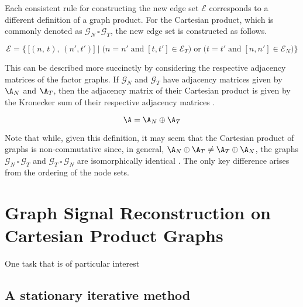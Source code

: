 Each consistent rule for constructing the new edge set $\mathcal{E}$ corresponds to a different definition of a graph product. For the Cartesian product, which is commonly denoted as $\mathcal{G}_N \, \square \, \mathcal{G}_T$, the new edge set is constructed as follows. 

\begin{equation}
    \mathcal{E} = \Big\{\, \big[(n, \, t), \, (n',  t') \big] \; \Big| \; \big(n = n' \; \text{and} \; [t, t'] \in \mathcal{E}_T \big) \; \text{or} \; \big(t = t' \; \text{and} \; [n, n'] \in \mathcal{E}_N\big)  \Big\}
\end{equation}
     

This can be described more succinctly by considering the respective adjacency matrices of the factor graphs. If $\mathcal{G}_N$ and $\mathcal{G}_T$ have adjacency matrices given by $\A_N$ and $\A_T$, then the adjacency matrix of their Cartesian product is given by the Kronecker sum of their respective adjacency matrices \citep{Fiedler1973}. 

\begin{equation}
    \A = \A_N \oplus \A_T 
\end{equation}

Note that while, given this definition, it may seem that the Cartesian product of graphs is non-commutative since, in general, $\A_N \oplus \A_T  \neq \A_T \oplus \A_N $, the graphs $\mathcal{G}_N \, \square \, \mathcal{G}_T$ and $\mathcal{G}_T \, \square \, \mathcal{G}_N$ are isomorphically identical \citep{Imrich2000}. The only key difference arises from the ordering of the node sets. 




\section{Graph Signal Reconstruction on Cartesian Product Graphs}

\label{sec:gsr_cpg}

One task that is of particular interest 

\subsection{A stationary iterative method}

